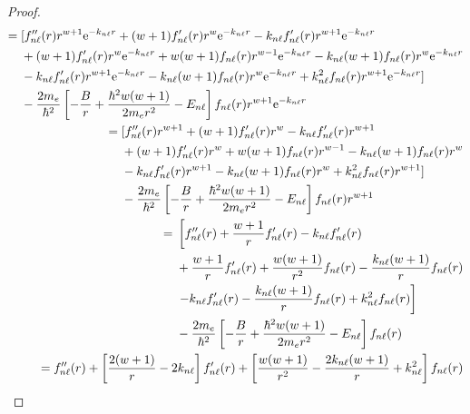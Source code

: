 \documentclass[../psets.tex]{subfiles}
\begin{document}
\begin{enumerate}
\begin{enumerate}
\begin{proof}
\begin{align*}
                \begin{split}
                    ={}& [f_{n\ell}''(r)r^{w+1}\e[-k_{n\ell}r]+(w+1)f_{n\ell}'(r)r^w\e[-k_{n\ell}r]-k_{n\ell}f_{n\ell}'(r)r^{w+1}\e[-k_{n\ell}r]\\
                    & +(w+1)f_{n\ell}'(r)r^w\e[-k_{n\ell}r]+w(w+1)f_{n\ell}(r)r^{w-1}\e[-k_{n\ell}r]-k_{n\ell}(w+1)f_{n\ell}(r)r^w\e[-k_{n\ell}r]\\
                    & -k_{n\ell}f_{n\ell}'(r)r^{w+1}\e[-k_{n\ell}r]-k_{n\ell}(w+1)f_{n\ell}(r)r^w\e[-k_{n\ell}r]+k_{n\ell}^2f_{n\ell}(r)r^{w+1}\e[-k_{n\ell}r]]\\
                    & -\frac{2m_e}{\hbar^2}\left[ -\frac{B}{r}+\frac{\hbar^2w(w+1)}{2m_er^2}-E_{n\ell} \right]f_{n\ell}(r)r^{w+1}\e[-k_{n\ell}r]
                \end{split}\\
                \begin{split}
                    ={}& [f_{n\ell}''(r)r^{w+1}+(w+1)f_{n\ell}'(r)r^w-k_{n\ell}f_{n\ell}'(r)r^{w+1}\\
                    & +(w+1)f_{n\ell}'(r)r^w+w(w+1)f_{n\ell}(r)r^{w-1}-k_{n\ell}(w+1)f_{n\ell}(r)r^w\\
                    & -k_{n\ell}f_{n\ell}'(r)r^{w+1}-k_{n\ell}(w+1)f_{n\ell}(r)r^w+k_{n\ell}^2f_{n\ell}(r)r^{w+1}]\\
                    & -\frac{2m_e}{\hbar^2}\left[ -\frac{B}{r}+\frac{\hbar^2w(w+1)}{2m_er^2}-E_{n\ell} \right]f_{n\ell}(r)r^{w+1}
                \end{split}\\
                \begin{split}
                    ={}& \left[ f_{n\ell}''(r)+\frac{w+1}{r}f_{n\ell}'(r)-k_{n\ell}f_{n\ell}'(r) \right.\\
                    & +\frac{w+1}{r}f_{n\ell}'(r)+\frac{w(w+1)}{r^2}f_{n\ell}(r)-\frac{k_{n\ell}(w+1)}{r}f_{n\ell}(r)\\
                    & \left. -k_{n\ell}f_{n\ell}'(r)-\frac{k_{n\ell}(w+1)}{r}f_{n\ell}(r)+k_{n\ell}^2f_{n\ell}(r) \right]\\
                    & -\frac{2m_e}{\hbar^2}\left[ -\frac{B}{r}+\frac{\hbar^2w(w+1)}{2m_er^2}-E_{n\ell} \right]f_{n\ell}(r)
                \end{split}\\
                \begin{split}
                    ={}& f_{n\ell}''(r)+\left[ \frac{2(w+1)}{r}-2k_{n\ell} \right]f_{n\ell}'(r)+\left[ \frac{w(w+1)}{r^2}-\frac{2k_{n\ell}(w+1)}{r}+k_{n\ell}^2 \right]f_{n\ell}(r)\\

\end{split}
\end{align*}
\end{proof}
\end{enumerate}
\end{enumerate}
\end{document}
